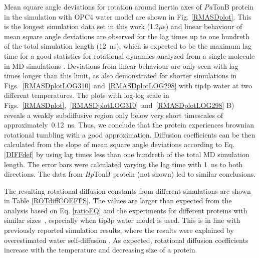 \documentclass[pre,aps,floatfix,authordate1-4,twocolumn]{revtex4-1}
\begin{document}
Mean square angle deviations for rotation around inertia axes
of {\it Pa}TonB protein in the simulation with OPC4 water model
are shown in Fig. \ref{RMASDplot}. This is the longest
simulation data set in this work (1.2$\mu$s) and
linear behaviour of mean square angle deviations are observed
for the lag times up to one hundreth of the total simulation length (12~ns),
which is expected to be the maximum lag time for a good statistics
for rotational dynamics analyzed from a single molecule in MD simulations \cite{lu06}.
Deviations from linear behaviour are only seen with lag times longer
than this limit, as also demonstrated for shorter simulations in
Figs.~\ref{RMASDplotLOG310}~and~\ref{RMASDplotLOG298} with tip4p water at
two different temperatures. The plots with log-log scale in
Figs.~\ref{RMASDplot},~\ref{RMASDplotLOG310}~and~\ref{RMASDplotLOG298} B)
reveals a weakly subdiffusive region only below very short timescales
of approximately~0.12~ns. Thus, we conclude that the protein
experiences brownian rotational tumbling with  a good approximation.
Diffusion coefficients can be then calculated from the slope of mean square angle
deviations according to Eq. \ref{DIFFdef} by using lag times less than
one hundreth of the total MD simulation length.
The error bars were calculated varying the lag time with 1~ns to both directions.
The data from {\it Hp}TonB protein (not shown) led to similar conclusions.

The resulting rotational diffusion constants from different simulations are
shown in Table \ref{ROTdiffCOEFFS}. The values are larger than 
expected from the analysis based on Eq. \ref{ratioEQ} and the experiments for different proteins with similar
sizes~\cite{krishnan98}, especially when tip3p water model is used.
This is in line with previously reported simulation results,
where the results were explained by overestimated water
self-diffusion \cite{wong08}. As expected, rotational diffusion coefficients
increase with the temperature and decreasing size of a protein.

\end{document}
